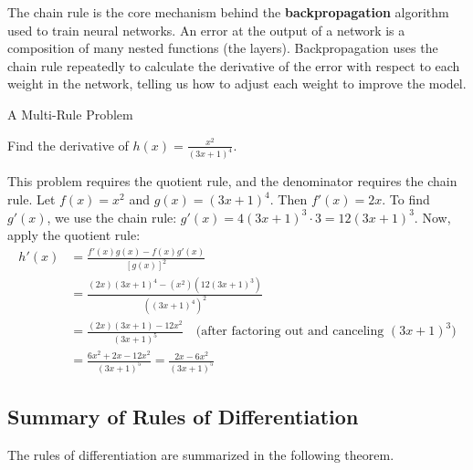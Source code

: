 The chain rule is the core mechanism behind the \textbf{backpropagation} algorithm used to train neural networks. An error at the output of a network is a composition of many nested functions (the layers). Backpropagation uses the chain rule repeatedly to calculate the derivative of the error with respect to each weight in the network, telling us how to adjust each weight to improve the model.

\begin{example} A Multi-Rule Problem

Find the derivative of \( h(x) = \frac{x^2}{(3x+1)^4} \).
\end{example}

\begin{solution}
This problem requires the quotient rule, and the denominator requires the chain rule.
Let \( f(x) = x^2 \) and \( g(x) = (3x+1)^4 \).
Then \( f'(x) = 2x \). To find \( g'(x) \), we use the chain rule: \( g'(x) = 4(3x+1)^3 \cdot 3 = 12(3x+1)^3 \).
Now, apply the quotient rule:
\[
\begin{aligned}
h'(x) &= \frac{f'(x)g(x) - f(x)g'(x)}{[g(x)]^2} \\
&= \frac{(2x)(3x+1)^4 - (x^2)(12(3x+1)^3)}{((3x+1)^4)^2} \\
&= \frac{(2x)(3x+1) - 12x^2}{(3x+1)^5} \quad \text{(after factoring out and canceling \((3x+1)^3\))} \\
&= \frac{6x^2 + 2x - 12x^2}{(3x+1)^5} = \frac{2x - 6x^2}{(3x+1)^5}
\end{aligned}
\]
\end{solution}

\subsection*{Summary of Rules of Differentiation}
\label{sec:ch10-common}

The rules of differentiation are summarized in the following theorem.


